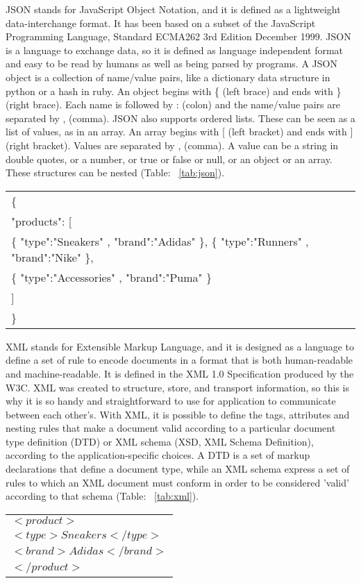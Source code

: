 JSON stands for JavaScript Object Notation, and it is defined as a lightweight data-interchange format. It has been based on a subset of the JavaScript Programming Language, Standard ECMA262 3rd Edition  December 1999. JSON is a language to exchange data, so it is defined as language independent format and easy to be read by humans as well as being parsed by programs. A JSON object is a collection of name/value pairs, like a dictionary data structure in python or a hash in ruby. An object begins with \{ (left brace) and ends with \} (right brace). Each name is followed by : (colon) and the name/value pairs are separated by , (comma). JSON also supports ordered lists. These can be seen as a list of values, as in an array. An array begins with [ (left bracket) and ends with ] (right bracket). Values are separated by , (comma). A value can be a string in double quotes, or a number, or true or false or null, or an object or an array. These structures can be nested (Table: ~\ref{tab:json}).

\begin{table*}[ht]
\centering
\begin{tabular}{| l |}
\hline
\{\\
"products": [\\
\{ "type":"Sneakers" , "brand":"Adidas" \}, \{ "type":"Runners" , "brand":"Nike" \},\\
\{ "type":"Accessories" , "brand":"Puma" \}\\
]\\ \}\\
\hline
\end{tabular}
\caption{A JSON example}
\label{tab:json}
\end{table*}

XML stands for Extensible Markup Language, and it is designed as a language to define a set of rule to encode documents in a format that is both human-readable and machine-readable. It is defined in the XML 1.0 Specification produced by the W3C. XML was created to structure, store, and transport information, so this is why it is so handy and straightforward to use for application to communicate between each other's. With XML, it is possible to define the tags, attributes and nesting rules that make a document valid according to a particular document type definition (DTD) or XML schema (XSD, XML Schema Definition), according to the application-specific choices. A DTD is a set of markup declarations that define a document type, while an XML schema express a set of rules to which an XML document must conform in order to be considered 'valid' according to that schema (Table: ~\ref{tab:xml}).
\\
\begin{table*}[ht]
\centering
\begin{tabular}{| l |}
\hline
$<product>$\\
  $<type>Sneakers</type>$\\
  $<brand>Adidas</brand>$\\
$</product>$\\
\hline
\end{tabular}
\caption{An XML example}
\label{tab:xml}
\end{table*}

